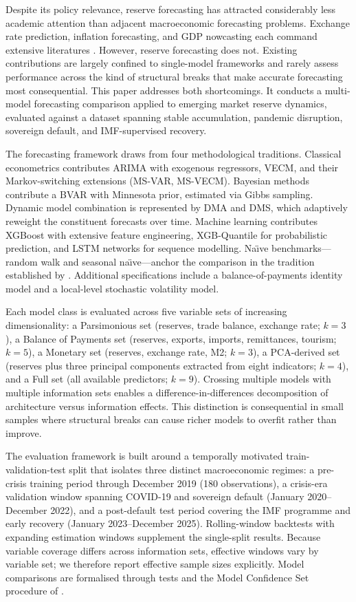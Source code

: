 \documentclass[12pt,a4paper]{article}
\begin{document}
Despite its policy relevance, reserve forecasting has attracted considerably less academic attention than adjacent macroeconomic forecasting problems. Exchange rate prediction, inflation forecasting, and GDP nowcasting each command extensive literatures \citep{Rossi2013}. However, reserve forecasting does not. Existing contributions are largely confined to single-model frameworks \citep{SehgalSharma2008,Gosselin2005} and rarely assess performance across the kind of structural breaks that make accurate forecasting most consequential. This paper addresses both shortcomings. It conducts a multi-model forecasting comparison applied to emerging market reserve dynamics, evaluated against a dataset spanning stable accumulation, pandemic disruption, sovereign default, and IMF-supervised recovery.

The forecasting framework draws from four methodological traditions. Classical econometrics contributes ARIMA with exogenous regressors, VECM, and their Markov-switching extensions (MS-VAR, MS-VECM). Bayesian methods contribute a BVAR with Minnesota prior, estimated via Gibbs sampling. Dynamic model combination is represented by DMA and DMS, which adaptively reweight the constituent forecasts over time. Machine learning contributes XGBoost with extensive feature engineering, XGB-Quantile for probabilistic prediction, and LSTM networks for sequence modelling. Na\"{\i}ve benchmarks---random walk and seasonal na\"{\i}ve---anchor the comparison in the tradition established by \cite{MeeseRogoff1983}. Additional specifications include a balance-of-payments identity model and a local-level stochastic volatility model.

Each model class is evaluated across five variable sets of increasing dimensionality: a Parsimonious set (reserves, trade balance, exchange rate; $k=3$), a Balance of Payments set (reserves, exports, imports, remittances, tourism; $k=5$), a Monetary set (reserves, exchange rate, M2; $k=3$), a PCA-derived set (reserves plus three principal components extracted from eight indicators; $k=4$), and a Full set (all available predictors; $k=9$). Crossing multiple models with multiple information sets enables a difference-in-differences decomposition of architecture versus information effects. This distinction is consequential in small samples where structural breaks can cause richer models to overfit rather than improve.

The evaluation framework is built around a temporally motivated train-validation-test split that isolates three distinct macroeconomic regimes: a pre-crisis training period through December 2019 (180 observations), a crisis-era validation window spanning COVID-19 and sovereign default (January 2020--December 2022), and a post-default test period covering the IMF programme and early recovery (January 2023--December 2025). Rolling-window backtests with expanding estimation windows supplement the single-split results. Because variable coverage differs across information sets, effective windows vary by variable set; we therefore report effective sample sizes explicitly. Model comparisons are formalised through \cite{DieboldMariano1995} tests and the Model Confidence Set procedure of \cite{HansenLundeNason2011}.
\end{document}
